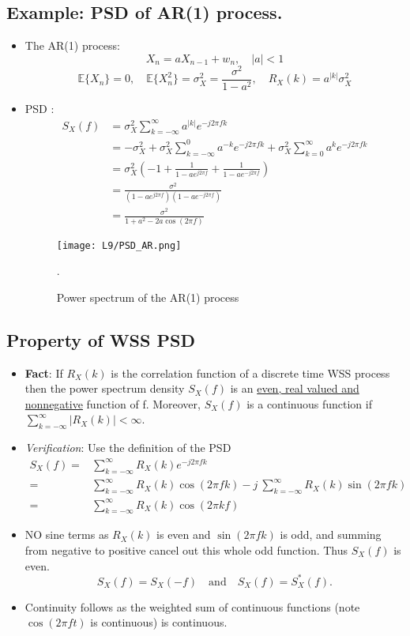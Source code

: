 \documentclass[12pt]{article}
\newcommand{\sigd}{\sigma^2}
\newcommand{\mexpproc}[1]{\mathbb{E}\{ #1\}}
\newcommand{\summ}[2]{\sum_{#1}^{#2}}
\newcommand{\sumkinfinf}{\summ{k=-\infty}{\infty}}
\newcommand{\psd}{S_X(f)}
\newcommand{\correlation}[1]{R_X(#1)}
\newcommand{\focoef}[1]{e^{-j2\pi f #1}}
\newcommand{\focoefinv}[1]{e^{j2\pi f #1}}
\begin{document}
\subsection{Example: PSD of AR(1) process.}
\begin{itemize}
    \item The AR(1) process:
\[
X_n = aX_{n-1} + w_n, \quad |a| < 1
\]
\[
\mexpproc{X_n} = 0, \quad \mexpproc{X_n^2}=\sigd_X = \frac{\sigd}{1-a^2}, \quad \correlation{k}=a^{|k|}\sigd_X
\]
\item PSD :
\begin{align*}
    \psd & = \sigd_X \sumkinfinf a^{|k|}\focoef{k}\\
    & = -\sigd_X + \sigd_X \sum_{k=-\infty}^0 a^{-k}\focoef{k} + \sigd_X \sum_{k=0}^\infty a^{k}\focoef{k} \\
    & = \sigd_X \left(-1 + \frac{1}{1-a\focoefinv{}} + \frac{1}{1-a\focoef{}} \right)  \\
    & = \frac{\sigd}{(1-a\focoefinv{})(1-a\focoef{})} \\
    & = \frac{\sigd}{1 + a^2 - 2a\cos(2\pi f)}
\end{align*}
\begin{figure}[H]
    \centering
    \texttt{[image: L9/PSD\_AR.png]}
    \caption{Power spectrum of the AR(1) process}.
\end{figure}
\end{itemize}
\subsection{Property of WSS PSD}
\begin{itemize}
    \item \textbf{Fact}: If $R_X(k)$ is the correlation function of a discrete time WSS process then the power spectrum density $\psd$ is an \underline{even, real valued and nonnegative} function of f. Moreover, $\psd$ is a continuous function if $\sumkinfinf |\correlation{k}| < \infty$.
    \item \textit{Verification}: Use the definition of the PSD
\begin{align*}
    \psd = & \sumkinfinf R_X(k)\focoef{k} \\
    = & \sumkinfinf R_X(k)\cos(2\pi f k) - j \ \sumkinfinf R_X(k)\sin(2\pi f k) \\
    = & \sumkinfinf R_X(k) \cos(2\pi k f)
\end{align*}
\item NO sine terms as $R_X(k)$ is even and $\sin(2\pi f k)$ is odd, and summing from negative to positive cancel out this whole odd function. Thus $\psd$ is even.
\[
\psd = S_X(-f) \quad \textrm{and} \quad \psd = S_X^*(f).
\]
\item Continuity follows as the weighted sum of continuous functions (note $\cos(2\pi f t)$ is continuous) is continuous.
\end{itemize}
\end{document}
